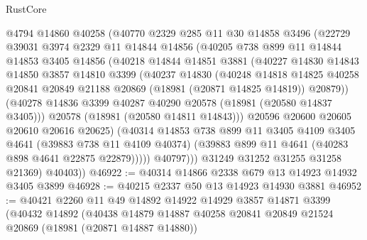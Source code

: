 \begin{lexlean}{RustCore}
\begin{coremodule}
              @4794
              @14860
              @40258
              (@40770
                @2329
                @285
                @11
                @30
                @14858
                @3496
                (@22729
                  @39031
                  @3974
                  @2329
                  @11
                  @14844
                  @14856
                  (@40205
                    @738
                    @899
                    @11
                    @14844
                    @14853
                    @3405
                    @14856
                    (@40218
                      @14844
                      @14851
                      @3881
                      (@40227
                        @14830
                        @14843
                        @14850
                        @3857
                        @14810
                        @3399
                        (@40237
                          @14830
                          (@40248
                            @14818
                            @14825
                            @40258
                            @20841
                            @20849
                            @21188
                            @20869
                            (@18981 (@20871 @14825 @14819))
                            @20879))
                        (@40278 @14836 @3399 @40287 @40290 @20578 (@18981 (@20580 @14837 @3405)))
                        @20578
                        (@18981 (@20580 @14811 @14843)))
                      @20596
                      @20600
                      @20605
                      @20610
                      @20616
                      @20625)
                    (@40314
                      @14853
                      @738
                      @899
                      @11
                      @3405
                      @4109
                      @3405
                      @4641
                      (@39883 @738 @11 @4109 @40374)
                      (@39883 @899 @11 @4641 (@40283 @898 @4641 @22875 @22879)))))
                @40797)))
          @31249
          @31252
          @31255
          @31258
          @21369)
        @40403))
@46922 := @40314 @14866 @2338 @679 @13 @14923 @14932 @3405 @3899
@46928 := @40215 @2337 @50 @13 @14923 @14930 @3881
@46952 := @40421
    @2260
    @11
    @49
    @14892
    @14922
    @14929
    @3857
    @14871
    @3399
    (@40432
      @14892
      (@40438
        @14879
        @14887
        @40258
        @20841
        @20849
        @21524
        @20869
        (@18981 (@20871 @14887 @14880))

\end{coremodule}
\end{lexlean}
